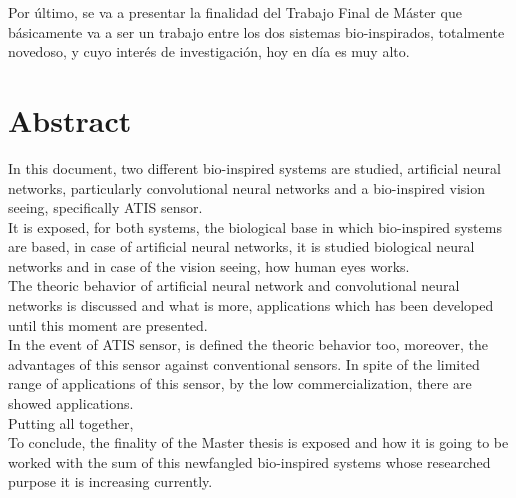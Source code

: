 \documentclass[12pt,a4paper,titlepage,twoside]{book}
\begin{document}
Por último, se va a presentar la finalidad del Trabajo Final de Máster que básicamente va a ser un trabajo entre los dos sistemas bio-inspirados, totalmente novedoso, y cuyo interés de investigación, hoy en día es muy alto.\\



\chapter*{Abstract}
In this document, two different bio-inspired systems are studied, artificial neural networks, particularly convolutional neural networks and a bio-inspired vision seeing, specifically ATIS sensor. \\

It is exposed, for both systems, the biological base in which bio-inspired systems are based, in case of artificial neural networks, it is studied biological neural networks and in case of the vision seeing, how human eyes works.\\

The theoric behavior of artificial neural network and convolutional neural networks is discussed and what is more, applications which has been developed until this moment are presented.\\

In the event of ATIS sensor, is defined the theoric behavior too, moreover, the advantages of this sensor against conventional sensors. In spite of the limited range of applications of this sensor, by the low commercialization, there are showed applications.\\
Putting all together,\\

To conclude, the finality of the Master thesis is exposed and how it is going to be worked with the sum of this newfangled bio-inspired systems whose researched purpose it is increasing currently.\\



\tableofcontents %





\mainmatter


	
	
	\label{cap:teoria}
	






\fancyhead[RO]{} %
\listoffigures 	%
\end{document}
